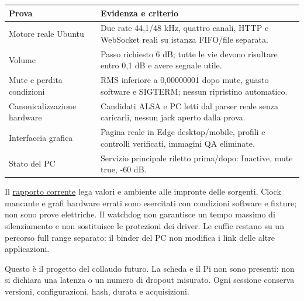 \documentclass[
  italian,
  11pt,
  a4paper,
]{article}
\newcounter{none} %
\begin{document}
{\def\LTcaptype{none} %
\begin{longtable}[]{@{}
  >{\raggedright\arraybackslash}p{}
  >{\raggedright\arraybackslash}p{}@{}}
\toprule\noalign{}
\begin{minipage}[b]{\linewidth}\raggedright
Prova
\end{minipage} & \begin{minipage}[b]{\linewidth}\raggedright
Evidenza e criterio
\end{minipage} \\
\midrule\noalign{}
\endhead
\bottomrule\noalign{}
\endlastfoot
Motore reale Ubuntu & Due rate 44,1/48 kHz, quattro canali, HTTP e WebSocket reali su
istanza FIFO/file separata. \\
Volume & Passo richiesto 6 dB; tutte le vie devono risultare entro 0,1 dB e avere segnale
utile. \\
Mute e perdita condizioni & RMS inferiore a 0,00000001 dopo mute, guasto software e SIGTERM;
nessun ripristino automatico. \\
Canonicalizzazione hardware & Candidati ALSA e PC letti dal parser reale senza caricarli,
nessun jack aperto dalla prova. \\
Interfaccia grafica & Pagina reale in Edge desktop/mobile, profili e controlli verificati,
immagini QA eliminate. \\
Stato del PC & Servizio principale riletto prima/dopo: Inactive, mute true, -60 dB. \\
\end{longtable}
}

Il \href{../../research-vault/sistema-autonomo-20261120/risultati-controllo.json}{rapporto
corrente} lega valori e ambiente alle impronte delle sorgenti. Clock mancante e grafi
hardware errati sono esercitati con condizioni software e fixture; non sono prove
elettriche. Il watchdog non garantisce un tempo massimo di silenziamento e non sostituisce
le protezioni dei driver. Le cuffie restano su un percorso full range separato: il binder
del PC non modifica i link delle altre applicazioni.

Questo è il progetto del collaudo futuro. La scheda e il Pi non sono presenti: non si
dichiara una latenza o un numero di dropout misurato. Ogni sessione conserva versioni,
configurazioni, hash, durata e acquisizioni.
\end{document}
